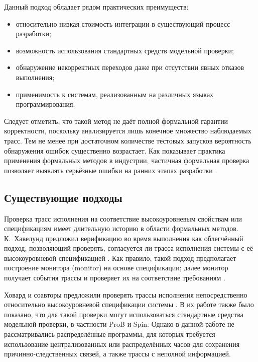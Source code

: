 Данный подход обладает рядом практических преимуществ:

\begin{itemize}
    \item относительно низкая стоимость интеграции в существующий
    процесс разработки;
    \item возможность использования стандартных средств модельной
    проверки;
    \item обнаружение некорректных переходов даже при отсутствии
    явных отказов выполнения;
    \item применимость к системам, реализованным на различных языках
    программирования.
\end{itemize}

Следует отметить, что такой метод не даёт полной формальной гарантии
корректности, поскольку анализируется лишь конечное множество
наблюдаемых трасс. Тем не менее при достаточном количестве тестовых
запусков вероятность обнаружения ошибок существенно возрастает. Как
показывает практика применения формальных методов в индустрии,
частичная формальная проверка позволяет выявлять серьёзные ошибки на
ранних этапах разработки \cite{howard2024ccf}.

\subsection{Существующие подходы}

Проверка трасс исполнения на соответствие высокоуровневым свойствам
или спецификациям имеет длительную историю в области формальных
методов. К.~Хавелунд предложил верификацию во время выполнения как
облегчённый подход, позволяющий проверять, согласуется ли трасса
исполнения системы с её высокоуровневой спецификацией
\cite{havelund2000runtime}. Как правило, такой подход предполагает
построение монитора (monitor) на основе спецификации; далее монитор получает
события трассы и проверяет их на соответствие требованиям
\cite{falcone2013runtime}.

Ховард и соавторы предложили проверять трассы исполнения
непосредственно относительно высокоуровневой спецификации системы
\cite{howard2011tracechecking}. В их работе также было показано, что
для такой проверки могут использоваться стандартные средства модельной
проверки, в частности ProB и Spin. Однако в данной работе не
рассматривались распределённые программы, для которых требуется
использование централизованных или распределённых часов для сохранения
причинно-следственных связей, а также трассы с неполной информацией.

